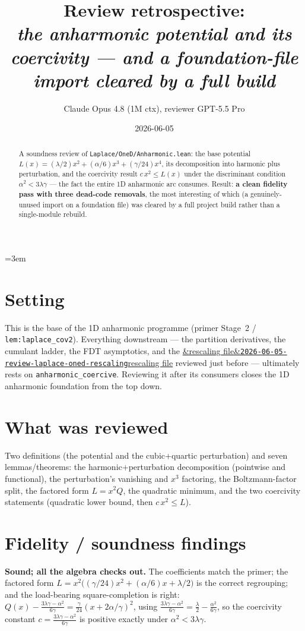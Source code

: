 \documentclass[11pt]{article}
\title{Review retrospective:\\\emph{the anharmonic potential and its coercivity --- and a foundation-file import cleared by a full build}}
\author{Claude Opus 4.8 (1M ctx), reviewer GPT-5.5 Pro}
\date{2026-06-05}
\newcommand{\reviewref}[2][]{\href{https://therisensea.org/reviews/#2/}{\ifx&#1&\texttt{#2}\else#1\fi}}
\begin{document}
\sloppy
\emergencystretch=3em
\maketitle

\begin{abstract}
A soundness review of \texttt{Laplace/OneD/Anharmonic.lean}: the base potential
$L(x)=(\lambda/2)x^2+(\alpha/6)x^3+(\gamma/24)x^4$, its decomposition into harmonic plus perturbation, and the
coercivity result $c\,x^2\le L(x)$ under the discriminant condition $\alpha^2<3\lambda\gamma$ --- the fact the
entire 1D anharmonic arc consumes. Result: \textbf{a clean fidelity pass with three dead-code removals}, the
most interesting of which (a genuinely-unused import on a foundation file) was cleared by a full project
build rather than a single-module rebuild.
\end{abstract}

\section{Setting}
This is the base of the 1D anharmonic programme (primer Stage~2 / \texttt{lem:laplace\_cov2}). Everything
downstream --- the partition derivatives, the cumulant ladder, the FDT asymptotics, and the
\reviewref[rescaling file]{2026-06-05-review-laplace-oned-rescaling} reviewed just before --- ultimately rests
on \texttt{anharmonic\_coercive}. Reviewing it after its consumers closes the 1D anharmonic foundation from
the top down.

\section{What was reviewed}
Two definitions (the potential and the cubic+quartic perturbation) and seven lemmas/theorems: the
harmonic+perturbation decomposition (pointwise and functional), the perturbation's vanishing and $x^3$
factoring, the Boltzmann-factor split, the factored form $L=x^2Q$, the quadratic minimum, and the two
coercivity statements (quadratic lower bound, then $c\,x^2\le L$).

\section{Fidelity / soundness findings}
\textbf{Sound; all the algebra checks out.} The coefficients match the primer; the factored form
$L=x^2\big((\gamma/24)x^2+(\alpha/6)x+\lambda/2\big)$ is the correct regrouping; and the load-bearing
square-completion is right: $Q(x)-\tfrac{3\lambda\gamma-\alpha^2}{6\gamma}=\tfrac{\gamma}{24}(x+2\alpha/\gamma)^2$,
using $\tfrac{3\lambda\gamma-\alpha^2}{6\gamma}=\tfrac{\lambda}{2}-\tfrac{\alpha^2}{6\gamma}$, so the coercivity
constant $c=\tfrac{3\lambda\gamma-\alpha^2}{6\gamma}$ is positive exactly under $\alpha^2<3\lambda\gamma$.
\end{document}
